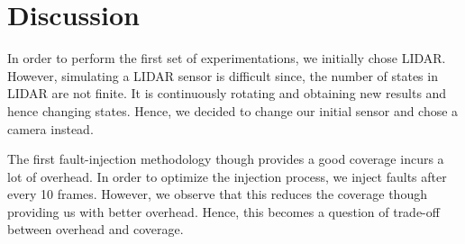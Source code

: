 \section{Discussion}
In order to perform the first set of experimentations, we initially chose LIDAR. However, simulating a LIDAR sensor is difficult since, the number of states in LIDAR are not finite. It is continuously rotating and obtaining new results and hence changing states. Hence, we decided to change our initial sensor and chose a camera instead.

The first fault-injection methodology though provides a good coverage incurs a lot of overhead. In order to optimize the injection process, we inject faults after every 10 frames. However, we observe that this reduces the coverage though providing us with better overhead. Hence, this becomes a question of trade-off between overhead and coverage. 


